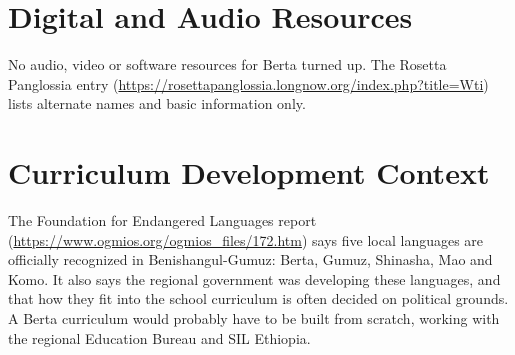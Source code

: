 \documentclass[12pt]{article}
\begin{document}
\section{Digital and Audio Resources}
No audio, video or software resources for Berta turned up. The Rosetta Panglossia entry (\url{https://rosettapanglossia.longnow.org/index.php?title=Wti}) lists alternate names and basic information only.

\section{Curriculum Development Context}
The Foundation for Endangered Languages report (\url{https://www.ogmios.org/ogmios_files/172.htm}) says five local languages are officially recognized in Benishangul-Gumuz: Berta, Gumuz, Shinasha, Mao and Komo. It also says the regional government was developing these languages, and that how they fit into the school curriculum is often decided on political grounds. A Berta curriculum would probably have to be built from scratch, working with the regional Education Bureau and SIL Ethiopia.
\end{document}
